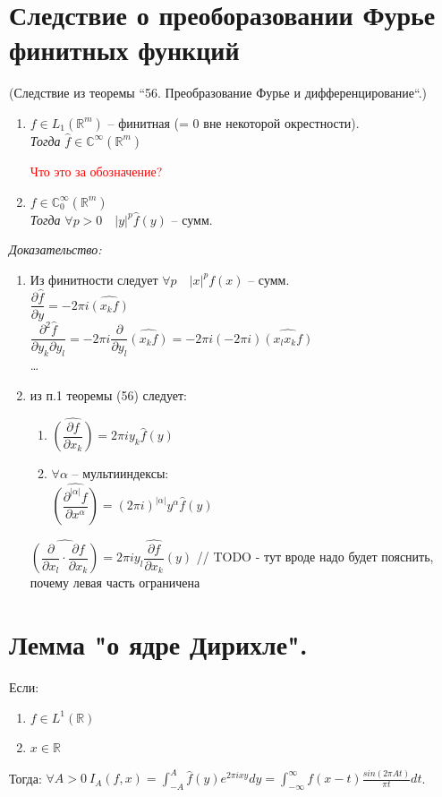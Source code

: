 \documentclass[paper=a4, fontsize=17pt]{article}
\begin{document}
\section{Следствие о преоборазовании Фурье финитных функций}
(Следствие из теоремы ``56. Преобразование Фурье и дифференцирование``.)
\begin{enumerate}
	\item $f \in L_1(\mathbb{R}^m)$ -- финитная (= 0 вне некоторой окрестности).\\
	\emph{Тогда} $\widehat{f} \in \mathbb{C}^{\infty}(\mathbb{R}^m)$
	
	\textcolor{red}{Что это за обозначение?}
	
	\item $f \in \mathbb{C}_0^\infty(\mathbb{R}^m)$\\
	\emph{Тогда} $\forall p > 0 \quad \lvert y \rvert ^ p \widehat{f}(y)$ -- сумм.
\end{enumerate}

\emph{Доказательство:}

\begin{enumerate}
	\item Из финитности следует $\forall p \quad \lvert x \rvert ^ p f(x)$ -- сумм.\\
	$\dfrac{\partial \widehat{f}}{\partial y} = -2\pi i \widehat{(x_k f)}$\\
	$\dfrac{\partial^2 \widehat{f}}{\partial y_k \partial y_l} = -2\pi i \dfrac{\partial}{\partial y_l} \widehat{(x_k f)} = -2\pi i (-2\pi i) \widehat{(x_l x_k f)}$\\ 
	\dots
	\item из п.1 теоремы (56) следует:
	\begin{enumerate}
		\item $\widehat{(\dfrac{\partial f}{\partial x_k})} = 2\pi i y_k \widehat{f}(y)$
		\item $\forall \alpha$ -- мультииндексы:\\
		$\widehat{(\dfrac{\partial^{\lvert\alpha\rvert} f}{\partial x^\alpha})} = (2\pi i)^{\lvert\alpha\rvert} y^\alpha \widehat{f}(y)$
	\end{enumerate}
	
	$\widehat{(\dfrac{\partial}{\partial x_l} \cdot \dfrac{\partial f}{\partial x_k})} = 2\pi i y_l \widehat{\dfrac{\partial f}{\partial x_k}}(y)$ // TODO - тут вроде надо будет пояснить, почему левая часть ограничена
\end{enumerate}
\section{Лемма "о ядре Дирихле".}
Если: 
\begin{enumerate}
    \item $f \in L^{1}(\mathbb{R})$
    \item $x \in \mathbb{R}$
\end{enumerate} 
Тогда: $\forall A > 0 \ I_{A}(f, x) = \int_{-A}^{A}\widehat f(y)e^{2\pi i x y}dy = \int_{-\infty}^{\infty}f(x - t)\frac{sin (2\pi A t)}{\pi t}dt$.
\end{document}
